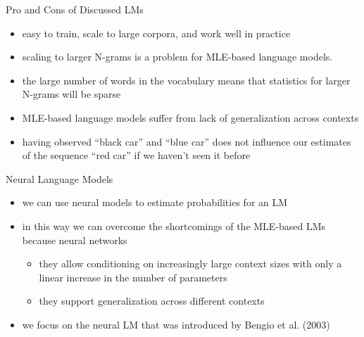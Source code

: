 \begin{frame}{Pro and Cons of Discussed LMs}
    \begin{itemize}
        \item<1-> easy to train, scale to large corpora, and work well in practice
        \item<2-> scaling to larger N-grams is a problem for MLE-based language models. 
        \item<3-> the large number of words in the vocabulary means that statistics for larger N-grams will be sparse
        \item<4-> MLE-based language models suffer from lack of generalization across contexts
        \item<5-> having observed ``black car'' and ``blue car'' does not influence our estimates of the sequence ``red car'' if we haven’t seen it before
    \end{itemize}
\end{frame}
\begin{frame}{Neural Language Models}
    \begin{itemize}
        \item<1-> we can use neural models to estimate probabilities for an LM
        \item<2-> in this way we can overcome the shortcomings of the MLE-based LMs because neural networks 
        \begin{itemize}
            \item<3-> they allow conditioning on increasingly large context sizes with only a linear increase in the number of parameters
            \item<4-> they support generalization across different contexts
        \end{itemize}
        \item<5-> we focus on the neural LM that was introduced by Bengio et al. (2003)
    \end{itemize}
\end{frame}
